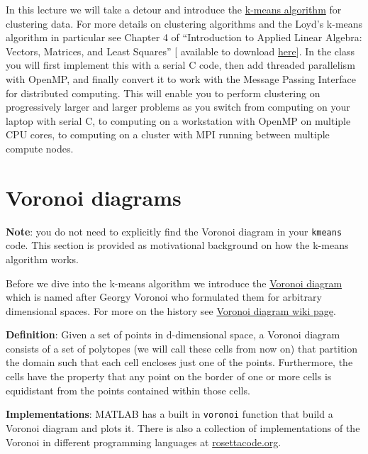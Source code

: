 

\minitoc

In this lecture we will take a detour and introduce the \href{https://en.wikipedia.org/wiki/K-means_clustering}{k-means algorithm} for clustering data. For more details on clustering algorithms and the Loyd's k-means algorithm in particular see Chapter 4 of ``Introduction to Applied Linear Algebra: Vectors, Matrices, and Least Squares'' \cite{boyd2018introduction} [ available to download  \href{http://vmls-book.stanford.edu/vmls.pdf}{here}]. In the class you will first implement this with a serial C code, then add threaded parallelism with OpenMP, and finally convert it to work with the Message Passing Interface for distributed computing. This will enable you to perform clustering on progressively larger and larger problems as you switch from computing on your laptop with serial C, to computing on a workstation with OpenMP on multiple CPU cores, to computing on a cluster with MPI running between multiple compute nodes.

\section{Voronoi diagrams}

{\bf Note}: you do not need to explicitly find the Voronoi diagram in your \texttt{kmeans} code. This section is provided as motivational background on how the k-means algorithm works.

Before we dive into the k-means algorithm we introduce the \href{https://en.wikipedia.org/wiki/Voronoi_diagram}{Voronoi diagram} which is named after Georgy Voronoi who formulated them for arbitrary dimensional spaces. For more on the history see    \href{https://en.wikipedia.org/wiki/Voronoi_diagram}{Voronoi diagram wiki page}. 

{\bf Definition}: Given a set of points in d-dimensional space, a Voronoi diagram consists of a set of polytopes (we will call these cells from now on) that partition the domain such that each cell encloses just one of the points. Furthermore, the cells have the property that any point on the border of one or more cells is equidistant from the points contained within those cells.

{\bf Implementations}: MATLAB has a built in \texttt{voronoi} function that build a Voronoi diagram and plots it. There is also a collection of implementations of the Voronoi in different programming languages at \href{https://rosettacode.org/wiki/Voronoi_diagram}{rosettacode.org}.


